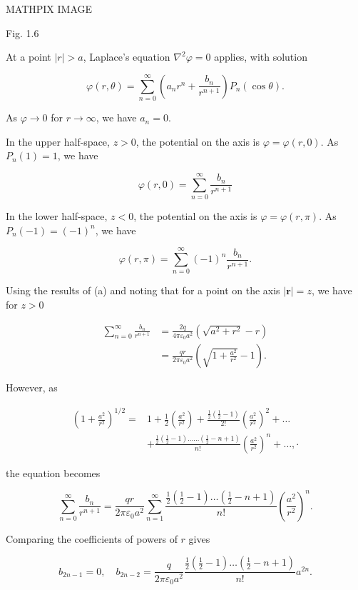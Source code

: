 \documentclass[10pt]{article}
\begin{document}
MATHPIX IMAGE

Fig. 1.6

 At a point $|r|>a$, Laplace's equation $\nabla^{2} \varphi=0$ applies, with solution

$$
\varphi(r, \theta)=\sum_{n=0}^{\infty}\left(a_{n} r^{n}+\frac{b_{n}}{r^{n+1}}\right) P_{n}(\cos \theta) .
$$

As $\varphi \rightarrow 0$ for $r \rightarrow \infty$, we have $a_{n}=0$.

In the upper half-space, $z>0$, the potential on the axis is $\varphi=\varphi(r, 0)$. As $P_{n}(1)=1$, we have

$$
\varphi(r, 0)=\sum_{n=0}^{\infty} \frac{b_{n}}{r^{n+1}}
$$

In the lower half-space, $z<0$, the potential on the axis is $\varphi=\varphi(r, \pi)$. As $P_{n}(-1)=(-1)^{n}$, we have

$$
\varphi(r, \pi)=\sum_{n=0}^{\infty}(-1)^{n} \frac{b_{n}}{r^{n+1}} .
$$

Using the results of (a) and noting that for a point on the axis $|\mathbf{r}|=z$, we have for $z>0$

$$
\begin{aligned}
\sum_{n=0}^{\infty} \frac{b_{n}}{r^{n+1}} &=\frac{2 q}{4 \pi \varepsilon_{0} a^{2}}\left(\sqrt{a^{2}+r^{2}}-r\right) \\
&=\frac{q r}{2 \pi \varepsilon_{0} a^{2}}\left(\sqrt{1+\frac{a^{2}}{r^{2}}}-1\right) .
\end{aligned}
$$

However, as

$$
\begin{aligned}
\left(1+\frac{a^{2}}{r^{2}}\right)^{1 / 2}=& 1+\frac{1}{2}\left(\frac{a^{2}}{r^{2}}\right)+\frac{\frac{1}{2}\left(\frac{1}{2}-1\right)}{2 !}\left(\frac{a^{2}}{r^{2}}\right)^{2}+\ldots \\
&+\frac{\frac{1}{2}\left(\frac{1}{2}-1\right) \ldots \ldots\left(\frac{1}{2}-n+1\right)}{n !}\left(\frac{a^{2}}{r^{2}}\right)^{n}+\ldots, \cdot
\end{aligned}
$$

the equation becomes

$$
\sum_{n=0}^{\infty} \frac{b_{n}}{r^{n+1}}=\frac{q r}{2 \pi \varepsilon_{0} a^{2}} \sum_{n=1}^{\infty} \frac{\frac{1}{2}\left(\frac{1}{2}-1\right) \ldots\left(\frac{1}{2}-n+1\right)}{n !}\left(\frac{a^{2}}{r^{2}}\right)^{n} .
$$

Comparing the coefficients of powers of $r$ gives

$$
b_{2 n-1}=0, \quad b_{2 n-2}=\frac{q}{2 \pi \varepsilon_{0} a^{2}} \frac{\frac{1}{2}\left(\frac{1}{2}-1\right) \ldots\left(\frac{1}{2}-n+1\right)}{n !} a^{2 n} .
$$
\end{document}
